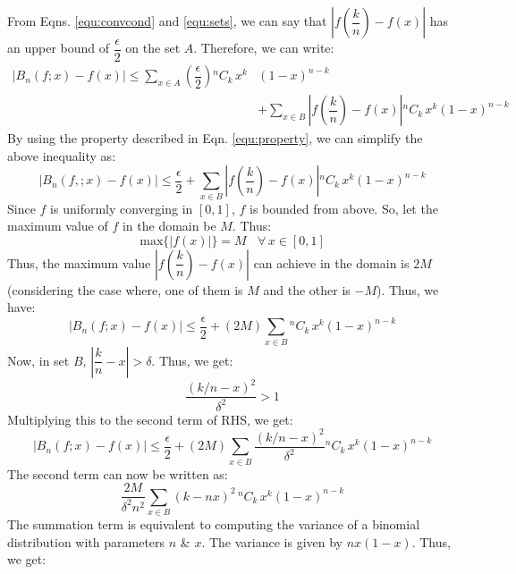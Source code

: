 \documentclass[
]{book}
\begin{document}
From Eqns. \ref{equ:convcond} and \ref{equ:sets}, we can say that \(\left|f\left(\dfrac{k}{n}\right) - f(x)\right|\) has an upper bound of \(\dfrac{\epsilon}{2}\) on the set \(A\). Therefore, we can write:
\begin{equation*}
\begin{split}
    |B_n(f;x) - f(x)| \leq \sum_{x\in A} \left(\dfrac{\epsilon}{2}\right){}^nC_{k}\, x^k &(1-x)^{n-k} \\
    &+ \sum_{x\in B} \left|f\left(\dfrac{k}{n}\right) - f(x)\right |{}^nC_{k}\, x^k (1-x)^{n-k}
\end{split}
\end{equation*}
By using the property described in Eqn. \ref{equ:property}, we can simplify the above inequality as:
\begin{equation*}
    |B_n(f,;x) - f(x)| \leq \frac{\epsilon}{2} + \sum_{x\in B} \left|f\left(\dfrac{k}{n}\right) - f(x)\right |{}^nC_{k}\, x^k (1-x)^{n-k}
\end{equation*}
Since \(f\) is uniformly converging in \([0,1]\), \(f\) is bounded from above. So, let the maximum value of \(f\) in the domain be \(M\). Thus:
\begin{equation*}
    \text{max\{} | f(x) | \} = M \ \ \ \  \forall \, x \in [0,1]
\end{equation*}
Thus, the maximum value \(\left|f\left(\dfrac{k}{n}\right) - f(x)\right|\) can achieve in the domain is \(2M\) (considering the case where, one of them is \(M\) and the other is \(-M\)). Thus, we have:
\begin{equation*}
    |B_n(f;x) - f(x)| \leq \frac{\epsilon}{2} + (2M) \sum_{x\in B} {{}^nC_{k}\, x^k (1-x)^{n-k}}
\end{equation*}
Now, in set \(B\), \(\left| \dfrac{k}{n} - x \right| > \delta\). Thus, we get:
\begin{equation*}
    \frac{\left( k/n - x \right)^2}{\delta^2} > 1
\end{equation*}
Multiplying this to the second term of RHS, we get:
\begin{equation*}
    |B_n(f;x) - f(x)| \leq \frac{\epsilon}{2} + (2M) \sum_{x\in B} {\frac{\left( k/n - x \right)^2}{\delta^2}{}^nC_{k}\, x^k (1-x)^{n-k}}
\end{equation*}
The second term can now be written as:
\begin{equation*}
    \dfrac{2M}{\delta^2 n^2} \sum_{x\in B} {(k-nx)^2 \, {}^nC_{k}\, x^k (1-x)^{n-k}}
\end{equation*}
The summation term is equivalent to computing the variance of a binomial distribution with parameters \(n\) \& \(x\). The variance is given by \(nx(1-x)\). Thus, we get:
\end{document}
